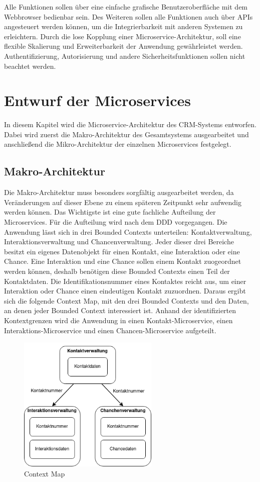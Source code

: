 Alle Funktionen sollen über eine einfache grafische Benutzeroberfläche mit dem Webbrowser bedienbar sein. Des Weiteren sollen alle Funktionen auch über \acp{API} angesteuert werden können, um die Integrierbarkeit mit anderen Systemen zu erleichtern. Durch die lose Kopplung einer Microservice-Architektur, soll eine flexible Skalierung und Erweiterbarkeit der Anwendung gewährleistet werden. Authentifizierung, Autorisierung und andere Sicherheitsfunktionen sollen nicht beachtet werden.

\clearpage
\section{Entwurf der Microservices}
In diesem Kapitel wird die Microservice-Architektur des \ac{CRM}-Systems entworfen. Dabei wird zuerst die Makro-Architektur des Gesamtsystems ausgearbeitet und anschließend die Mikro-Architektur der einzelnen Microservices festgelegt.

\subsection{Makro-Architektur}
Die Makro-Architektur muss besonders sorgfältig ausgearbeitet werden, da Veränderungen auf dieser Ebene zu einem späteren Zeitpunkt sehr aufwendig werden können. Das Wichtigste ist eine gute fachliche Aufteilung der Microservices. Für die Aufteilung wird nach dem \ac{DDD} vorgegangen. Die Anwendung lässt sich in drei Bounded Contexts unterteilen: Kontaktverwaltung, Interaktionsverwaltung und Chancenverwaltung. Jeder dieser drei Bereiche besitzt ein eigenes Datenobjekt für einen Kontakt, eine Interaktion oder eine Chance. Eine Interaktion und eine Chance sollen einem Kontakt zuogeordnet werden können, deshalb benötigen diese Bounded Contexts einen Teil der Kontaktdaten. Die Identifikationsnummer eines Kontaktes reicht aus, um einer Interaktion oder Chance einen eindeutigen Kontakt zuzuordnen. Daraus ergibt sich die folgende Context Map, mit den drei Bounded Contexts und den Daten, an denen jeder Bounded Context interessiert ist. Anhand der identifizierten Kontextgrenzen wird die Anwendung in einen Kontakt-Microservice, einen Interaktions-Microservice und einen Chancen-Microservice aufgeteilt.

\begin{figure}[H] 
    \centering
    \includegraphics[width=0.60\textwidth]{figures/ContextMap.png}
    \caption{Context Map}
\end{figure}

